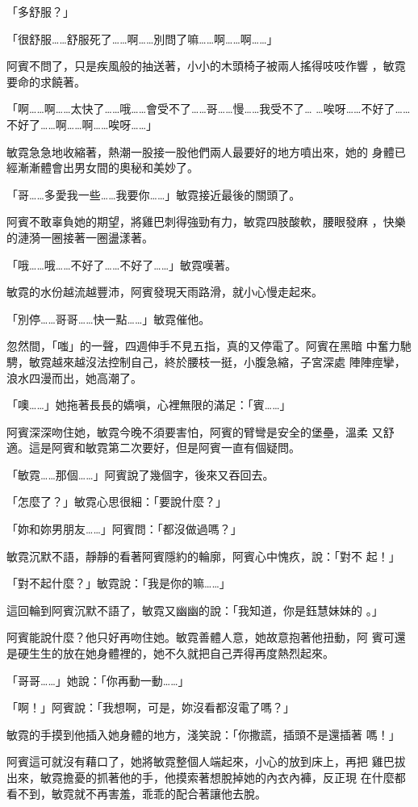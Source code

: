 「多舒服？」

「很舒服……舒服死了……啊……別問了嘛……啊……啊……」

阿賓不問了，只是疾風般的抽送著，小小的木頭椅子被兩人搖得吱吱作響
，敏霓要命的求饒著。

「啊……啊……太快了……哦……會受不了……哥……慢……我受不了…
…唉呀……不好了……不好了……啊……啊……唉呀……」

敏霓急急地收縮著，熱潮一股接一股他們兩人最要好的地方噴出來，她的
身體已經漸漸體會出男女間的奧秘和美妙了。

「哥……多愛我一些……我要你……」敏霓接近最後的關頭了。

阿賓不敢辜負她的期望，將雞巴刺得強勁有力，敏霓四肢酸軟，腰眼發麻
，快樂的漣漪一圈接著一圈盪漾著。

「哦……哦……不好了……不好了……」敏霓嘆著。

敏霓的水份越流越豐沛，阿賓發現天雨路滑，就小心慢走起來。

「別停……哥哥……快一點……」敏霓催他。

忽然間，「嗤」的一聲，四週伸手不見五指，真的又停電了。阿賓在黑暗
中奮力馳騁，敏霓越來越沒法控制自己，終於腰枝一挺，小腹急縮，子宮深處
陣陣痙攣，浪水四漫而出，她高潮了。

「噢……」她拖著長長的嬌嗔，心裡無限的滿足：「賓……」

阿賓深深吻住她，敏霓今晚不須要害怕，阿賓的臂彎是安全的堡壘，溫柔
又舒適。這是阿賓和敏霓第二次要好，但是阿賓一直有個疑問。

「敏霓……那個……」阿賓說了幾個字，後來又吞回去。

「怎麼了？」敏霓心思很細：「要說什麼？」

「妳和妳男朋友……」阿賓問：「都沒做過嗎？」

敏霓沉默不語，靜靜的看著阿賓隱約的輪廓，阿賓心中愧疚，說：「對不
起！」

「對不起什麼？」敏霓說：「我是你的嘛……」

這回輪到阿賓沉默不語了，敏霓又幽幽的說：「我知道，你是鈺慧妹妹的
。」

阿賓能說什麼？他只好再吻住她。敏霓善體人意，她故意抱著他扭動，阿
賓可還是硬生生的放在她身體裡的，她不久就把自己弄得再度熱烈起來。

「哥哥……」她說：「你再動一動……」

「啊！」阿賓說：「我想啊，可是，妳沒看都沒電了嗎？」

敏霓的手摸到他插入她身體的地方，淺笑說：「你撒謊，插頭不是還插著
嗎！」

阿賓這可就沒有藉口了，她將敏霓整個人端起來，小心的放到床上，再把
雞巴拔出來，敏霓擔憂的抓著他的手，他摸索著想脫掉她的內衣內褲，反正現
在什麼都看不到，敏霓就不再害羞，乖乖的配合著讓他去脫。

